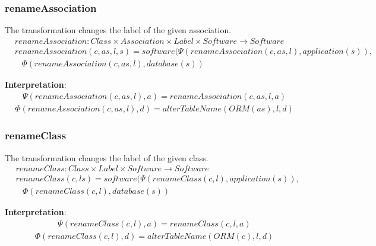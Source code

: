 \documentclass[10pt]{article}
\begin{document}
\subsubsection{renameAssociation}
The transformation changes the label of the given association.
\begin{align}
& renameAssociation: Class \times Association \times Label \times Software \rightarrow Software \nonumber \\
& renameAssociation(c, as, l, s) = software(\Psi(renameAssociation(c, as, l), application(s)),  \nonumber \\ 
& \;\;\;\Phi(renameAssociation(c, as, l), database(s))
\end{align}

\noindent \textbf{Interpretation}:
\begin{align}
\Psi(renameAssociation(c, as, l), a) = renameAssociation(c, as, l, a)
\end{align}
\begin{align}
\Phi(renameAssociation(c, as, l), d) = alterTableName(ORM(as), l, d)
\end{align}

\subsubsection{renameClass}
The transformation changes the label of the given class.
\begin{align}
& renameClass: Class \times Label \times Software \rightarrow Software \nonumber \\
& renameClass(c, l s) = software(\Psi(renameClass(c, l), application(s)), \nonumber \\
& \;\;\; \Phi(renameClass(c, l), database(s))
\end{align}

\noindent \textbf{Interpretation}:
\begin{align}
\Psi(renameClass(c, l), a) = renameClass(c, l, a)
\end{align}
\begin{align}
\Phi(renameClass(c, l), d) = alterTableName(ORM(c), l, d)
\end{align}

\end{document}
